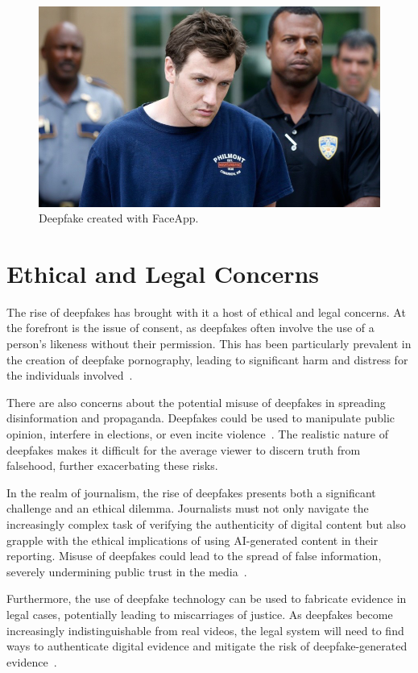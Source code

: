 \begin{figure}[ht]
	\centering
	\includegraphics[width=0.61\columnwidth]{figures/faceapp}
	\caption{Deepfake created with FaceApp.} %
\end{figure}


\section{Ethical and Legal Concerns}\label{chapter:legal}
The rise of deepfakes has brought with it a host of ethical and legal concerns.
At the forefront is the issue of consent, as deepfakes often involve the
use of a person's likeness without their permission. This has been
particularly prevalent in the creation of deepfake pornography, leading
to significant harm and distress for the individuals involved~\cite{chesney2019deep}.

There are also concerns about the potential misuse of deepfakes in spreading
disinformation and propaganda. Deepfakes could be used to manipulate public
opinion, interfere in elections, or even incite violence~\cite{deepfakes-business-insider,partnershiponai}.
The realistic nature of deepfakes makes it difficult for the average viewer
to discern truth from falsehood, further exacerbating these risks.

In the realm of journalism, the rise of deepfakes presents both a significant
challenge and an ethical dilemma. Journalists must not only navigate
the increasingly complex task of verifying the authenticity of digital
content but also grapple with the ethical implications of using \ac{AI}-generated
content in their reporting. Misuse of deepfakes could lead to the spread of
false information, severely undermining public trust in the media~\cite{doi:10.1177/2056305120903408}.

Furthermore, the use of deepfake technology can be used to fabricate evidence in
legal cases, potentially leading to miscarriages of justice. As deepfakes become
increasingly indistinguishable from real videos, the legal system will need to
find ways to authenticate digital evidence and mitigate the risk of deepfake-generated
evidence~\cite{chesney2019deep}.

